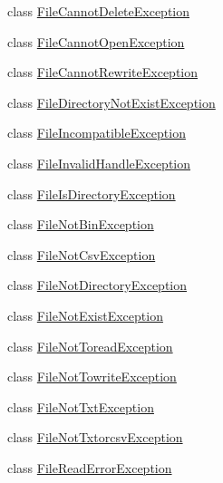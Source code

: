 \begin{DoxyCompactItemize}
class \hyperlink{class_m_q_l4_c_sharp_1_1_base_1_1_exceptions_1_1_file_cannot_delete_exception}{File\+Cannot\+Delete\+Exception}
\item 
class \hyperlink{class_m_q_l4_c_sharp_1_1_base_1_1_exceptions_1_1_file_cannot_open_exception}{File\+Cannot\+Open\+Exception}
\item 
class \hyperlink{class_m_q_l4_c_sharp_1_1_base_1_1_exceptions_1_1_file_cannot_rewrite_exception}{File\+Cannot\+Rewrite\+Exception}
\item 
class \hyperlink{class_m_q_l4_c_sharp_1_1_base_1_1_exceptions_1_1_file_directory_not_exist_exception}{File\+Directory\+Not\+Exist\+Exception}
\item 
class \hyperlink{class_m_q_l4_c_sharp_1_1_base_1_1_exceptions_1_1_file_incompatible_exception}{File\+Incompatible\+Exception}
\item 
class \hyperlink{class_m_q_l4_c_sharp_1_1_base_1_1_exceptions_1_1_file_invalid_handle_exception}{File\+Invalid\+Handle\+Exception}
\item 
class \hyperlink{class_m_q_l4_c_sharp_1_1_base_1_1_exceptions_1_1_file_is_directory_exception}{File\+Is\+Directory\+Exception}
\item 
class \hyperlink{class_m_q_l4_c_sharp_1_1_base_1_1_exceptions_1_1_file_not_bin_exception}{File\+Not\+Bin\+Exception}
\item 
class \hyperlink{class_m_q_l4_c_sharp_1_1_base_1_1_exceptions_1_1_file_not_csv_exception}{File\+Not\+Csv\+Exception}
\item 
class \hyperlink{class_m_q_l4_c_sharp_1_1_base_1_1_exceptions_1_1_file_not_directory_exception}{File\+Not\+Directory\+Exception}
\item 
class \hyperlink{class_m_q_l4_c_sharp_1_1_base_1_1_exceptions_1_1_file_not_exist_exception}{File\+Not\+Exist\+Exception}
\item 
class \hyperlink{class_m_q_l4_c_sharp_1_1_base_1_1_exceptions_1_1_file_not_toread_exception}{File\+Not\+Toread\+Exception}
\item 
class \hyperlink{class_m_q_l4_c_sharp_1_1_base_1_1_exceptions_1_1_file_not_towrite_exception}{File\+Not\+Towrite\+Exception}
\item 
class \hyperlink{class_m_q_l4_c_sharp_1_1_base_1_1_exceptions_1_1_file_not_txt_exception}{File\+Not\+Txt\+Exception}
\item 
class \hyperlink{class_m_q_l4_c_sharp_1_1_base_1_1_exceptions_1_1_file_not_txtorcsv_exception}{File\+Not\+Txtorcsv\+Exception}
\item 
class \hyperlink{class_m_q_l4_c_sharp_1_1_base_1_1_exceptions_1_1_file_read_error_exception}{File\+Read\+Error\+Exception}

\end{DoxyCompactItemize}
